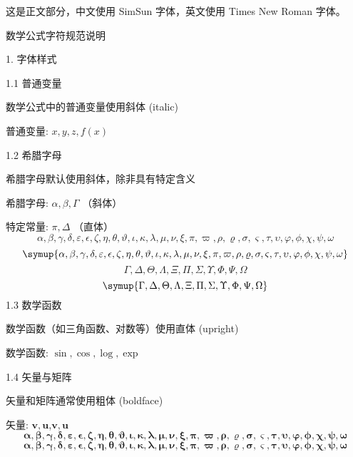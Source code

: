 \documentclass{article}
\begin{document}
这是正文部分，中文使用 SimSun 字体，英文使用 Times New Roman 字体。

数学公式字符规范说明

1. 字体样式

1.1 普通变量

数学公式中的普通变量使用斜体 (italic)

普通变量: $x, y, z, f(x)$

1.2 希腊字母

希腊字母默认使用斜体，除非具有特定含义

希腊字母: $\alpha, \beta, \Gamma$ （斜体）

特定常量: $\pi, \Delta$ （直体）
\begin{equation}
  \alpha, \beta, \gamma, \delta, \varepsilon, \epsilon, \zeta, \eta, \theta, \vartheta, \iota, \kappa, \lambda, \mu, \nu, \xi, \pi ,\varpi, \rho, \varrho, \sigma, \varsigma, \tau, \upsilon, \varphi, \phi, \chi, \psi, \omega
\end{equation}
\begin{equation}
    \symup{\alpha, \beta, \gamma, \delta, \varepsilon, \epsilon, \zeta, \eta, \theta, \vartheta, \iota, \kappa, \lambda, \mu, \nu, \xi, \pi ,\varpi, \rho, \varrho, \sigma, \varsigma, \tau, \upsilon, \varphi, \phi, \chi, \psi, \omega}
\end{equation}
\begin{equation}
  \Gamma, \Delta, \Theta, \Lambda, \Xi, \Pi, \Sigma, \Upsilon, \Phi, \Psi, \Omega
\end{equation}
\begin{equation}
  \symup{\Gamma, \Delta, \Theta, \Lambda, \Xi, \Pi, \Sigma, \Upsilon, \Phi, \Psi, \Omega}
\end{equation}
1.3 数学函数

数学函数（如三角函数、对数等）使用直体 (upright)

数学函数: $\sin, \cos, \log, \exp$

1.4 矢量与矩阵

矢量和矩阵通常使用粗体 (boldface)

矢量: $\symbf{v}, \boldsymbol{u}$,$\mathbf{v}, \mathbf{u}$
\begin{equation}
  \boldsymbol{\alpha, \beta, \gamma, \delta, \varepsilon, \epsilon, \zeta, \eta, \theta, \vartheta, \iota, \kappa, \lambda, \mu, \nu, \xi, \pi ,\varpi, \rho, \varrho, \sigma, \varsigma, \tau, \upsilon, \varphi, \phi, \chi, \psi, \omega}
\end{equation}
\begin{equation}
  \symbf{\alpha, \beta, \gamma, \delta, \varepsilon, \epsilon, \zeta, \eta, \theta, \vartheta, \iota, \kappa, \lambda, \mu, \nu, \xi, \pi ,\varpi, \rho, \varrho, \sigma, \varsigma, \tau, \upsilon, \varphi, \phi, \chi, \psi, \omega}
\end{equation}
\end{document}
